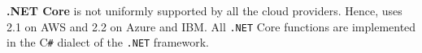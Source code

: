
\textbf{.NET Core} is not uniformly supported by all the cloud providers. 
Hence, \sys uses 2.1 on \gls{AWS} and 2.2 on Azure and \gls{IBM}.
All \texttt{.NET} Core functions are implemented in the C\texttt{\#} dialect of the \texttt{.NET} framework.

